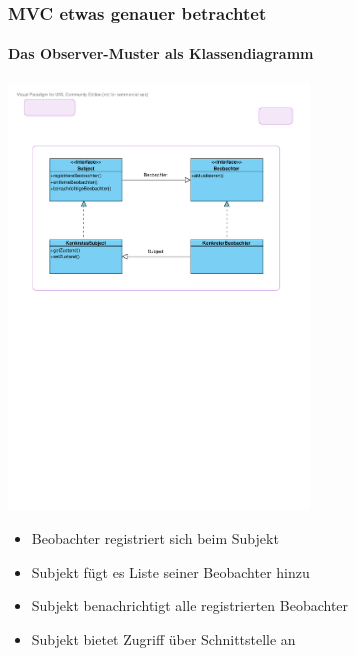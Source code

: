 \begin{frame}
	\frametitle{MVC etwas genauer betrachtet}
	\framesubtitle{Das Observer-Muster als Klassendiagramm}
	\begin{center}
		\includegraphics[trim = 18mm 155mm 22mm 45mm, clip, width=8cm]{../mvc/observer-kd.pdf}
	\end{center}	
	\begin{itemize}
		\item Beobachter registriert sich beim Subjekt
		\item Subjekt fügt es Liste seiner Beobachter hinzu
		\item Subjekt benachrichtigt alle registrierten Beobachter
		\item Subjekt bietet Zugriff über Schnittstelle an
	\end{itemize}
\end{frame}


